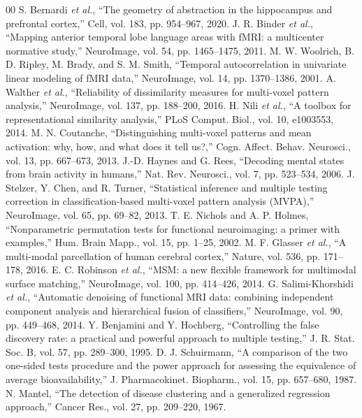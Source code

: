 \documentclass[conference]{IEEEtran}
\begin{document}
\begin{thebibliography}{00}
 S. Bernardi \emph{et al.}, ``The geometry of abstraction in the hippocampus and prefrontal cortex,'' Cell, vol. 183, pp. 954--967, 2020.
 J. R. Binder \emph{et al.}, ``Mapping anterior temporal lobe language areas with fMRI: a multicenter normative study,'' NeuroImage, vol. 54, pp. 1465--1475, 2011.
 M. W. Woolrich, B. D. Ripley, M. Brady, and S. M. Smith, ``Temporal autocorrelation in univariate linear modeling of fMRI data,'' NeuroImage, vol. 14, pp. 1370--1386, 2001.
 A. Walther \emph{et al.}, ``Reliability of dissimilarity measures for multi-voxel pattern analysis,'' NeuroImage, vol. 137, pp. 188--200, 2016.
 H. Nili \emph{et al.}, ``A toolbox for representational similarity analysis,'' PLoS Comput. Biol., vol. 10, e1003553, 2014.
 M. N. Coutanche, ``Distinguishing multi-voxel patterns and mean activation: why, how, and what does it tell us?,'' Cogn. Affect. Behav. Neurosci., vol. 13, pp. 667--673, 2013.
 J.-D. Haynes and G. Rees, ``Decoding mental states from brain activity in humans,'' Nat. Rev. Neurosci., vol. 7, pp. 523--534, 2006.
 J. Stelzer, Y. Chen, and R. Turner, ``Statistical inference and multiple testing correction in classification-based multi-voxel pattern analysis (MVPA),'' NeuroImage, vol. 65, pp. 69--82, 2013.
 T. E. Nichols and A. P. Holmes, ``Nonparametric permutation tests for functional neuroimaging: a primer with examples,'' Hum. Brain Mapp., vol. 15, pp. 1--25, 2002.
 M. F. Glasser \emph{et al.}, ``A multi-modal parcellation of human cerebral cortex,'' Nature, vol. 536, pp. 171--178, 2016.
 E. C. Robinson \emph{et al.}, ``MSM: a new flexible framework for multimodal surface matching,'' NeuroImage, vol. 100, pp. 414--426, 2014.
 G. Salimi-Khorshidi \emph{et al.}, ``Automatic denoising of functional MRI data: combining independent component analysis and hierarchical fusion of classifiers,'' NeuroImage, vol. 90, pp. 449--468, 2014.
 Y. Benjamini and Y. Hochberg, ``Controlling the false discovery rate: a practical and powerful approach to multiple testing,'' J. R. Stat. Soc. B, vol. 57, pp. 289--300, 1995.
 D. J. Schuirmann, ``A comparison of the two one-sided tests procedure and the power approach for assessing the equivalence of average bioavailability,'' J. Pharmacokinet. Biopharm., vol. 15, pp. 657--680, 1987.
 N. Mantel, ``The detection of disease clustering and a generalized regression approach,'' Cancer Res., vol. 27, pp. 209--220, 1967.
\end{thebibliography}
\end{document}
